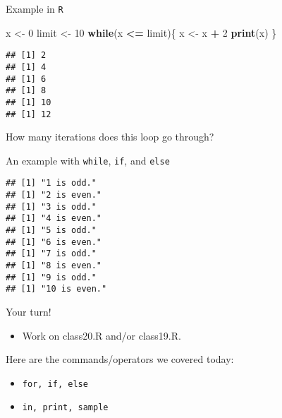 \documentclass[ignorenonframetext,]{beamer}
\newenvironment{Shaded}{\begin{snugshade}}{\end{snugshade}}
\newcommand{\KeywordTok}[1]{\textcolor[rgb]{0.13,0.29,0.53}{\textbf{#1}}}
\newcommand{\DecValTok}[1]{\textcolor[rgb]{0.00,0.00,0.81}{#1}}
\newcommand{\StringTok}[1]{\textcolor[rgb]{0.31,0.60,0.02}{#1}}
\newcommand{\ControlFlowTok}[1]{\textcolor[rgb]{0.13,0.29,0.53}{\textbf{#1}}}
\newcommand{\OperatorTok}[1]{\textcolor[rgb]{0.81,0.36,0.00}{\textbf{#1}}}
\newcommand{\NormalTok}[1]{#1}
\providecommand{\tightlist}{%
	\setlength{\itemsep}{0pt}\setlength{\parskip}{0pt}}
\begin{document}
\begin{frame}[fragile]{Example in \texttt{R}}

\begin{Shaded}
\begin{Highlighting}[]
\NormalTok{x <-}\StringTok{ }\DecValTok{0}
\NormalTok{limit <-}\StringTok{ }\DecValTok{10}
\ControlFlowTok{while}\NormalTok{(x }\OperatorTok{<=}\StringTok{ }\NormalTok{limit)\{}
\NormalTok{  x <-}\StringTok{ }\NormalTok{x }\OperatorTok{+}\StringTok{ }\DecValTok{2}
  \KeywordTok{print}\NormalTok{(x)}
\NormalTok{\}}
\end{Highlighting}
\end{Shaded}

\begin{verbatim}
## [1] 2
## [1] 4
## [1] 6
## [1] 8
## [1] 10
## [1] 12
\end{verbatim}

How many iterations does this loop go through?

\end{frame}

\begin{frame}[fragile]{An example with \texttt{while}, \texttt{if}, and
\texttt{else}}

\begin{Shaded}
\end{Shaded}

\begin{verbatim}
## [1] "1 is odd."
## [1] "2 is even."
## [1] "3 is odd."
## [1] "4 is even."
## [1] "5 is odd."
## [1] "6 is even."
## [1] "7 is odd."
## [1] "8 is even."
## [1] "9 is odd."
## [1] "10 is even."
\end{verbatim}

\end{frame}

\begin{frame}[fragile]{Your turn!}

\begin{itemize}
\tightlist
\item
  Work on class20.R and/or class19.R.
\end{itemize}

Here are the commands/operators we covered today:

\begin{itemize}
\tightlist
\item
  \texttt{for,\ if,\ else}
\item
  \texttt{in,\ print,\ sample}
\end{itemize}

\end{frame}
\end{document}
